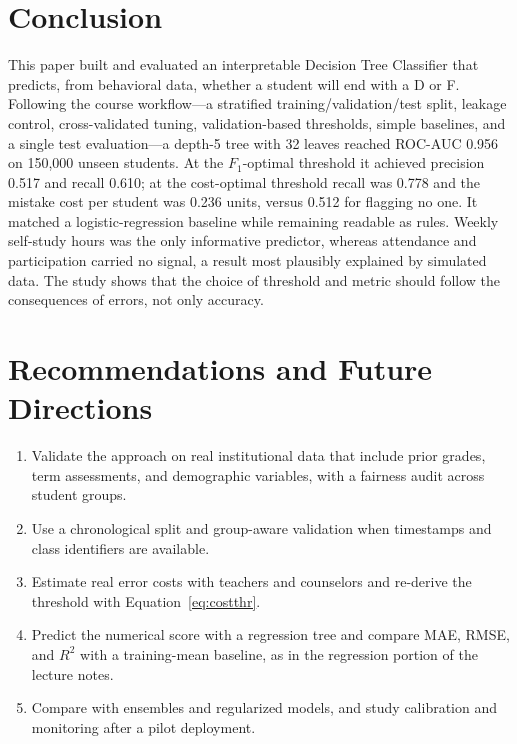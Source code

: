 \documentclass[12pt,a4paper]{article}
\theoremstyle{definition}
\begin{document}
\section{Conclusion}

This paper built and evaluated an interpretable Decision Tree Classifier that predicts, from behavioral data, whether a student will end with a D or F. Following the course workflow---a stratified training/validation/test split, leakage control, cross-validated tuning, validation-based thresholds, simple baselines, and a single test evaluation---a depth-5 tree with 32 leaves reached ROC-AUC 0.956 on 150{,}000 unseen students. At the $F_1$-optimal threshold it achieved precision 0.517 and recall 0.610; at the cost-optimal threshold recall was 0.778 and the mistake cost per student was 0.236 units, versus 0.512 for flagging no one. It matched a logistic-regression baseline while remaining readable as rules. Weekly self-study hours was the only informative predictor, whereas attendance and participation carried no signal, a result most plausibly explained by simulated data. The study shows that the choice of threshold and metric should follow the consequences of errors, not only accuracy.

\section{Recommendations and Future Directions}

\begin{enumerate}[label=\arabic*.]
    \item Validate the approach on real institutional data that include prior grades, term assessments, and demographic variables, with a fairness audit across student groups.
    \item Use a chronological split and group-aware validation when timestamps and class identifiers are available.
    \item Estimate real error costs with teachers and counselors and re-derive the threshold with Equation~\ref{eq:costthr}.
    \item Predict the numerical score with a regression tree and compare MAE, RMSE, and $R^2$ with a training-mean baseline, as in the regression portion of the lecture notes.
    \item Compare with ensembles and regularized models, and study calibration and monitoring after a pilot deployment.
\end{enumerate}
\end{document}
